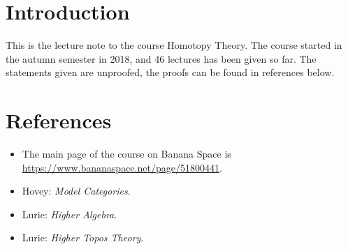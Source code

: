 \section*{Introduction}

This is the lecture note to the course Homotopy Theory. 
The course started in the autumn semester in 2018, and 46 lectures has been given so far.
The statements given are unproofed, the proofs can be found in references below.

\section*{References}

\begin{itemize}
\item The main page of the course on Banana Space is \url{https://www.bananaspace.net/page/51800441}.    
\item Hovey: \textit{Model Categories}.
\item Lurie: \textit{Higher Algebra}.
\item Lurie: \textit{Higher Topos Theory}.
\end{itemize}